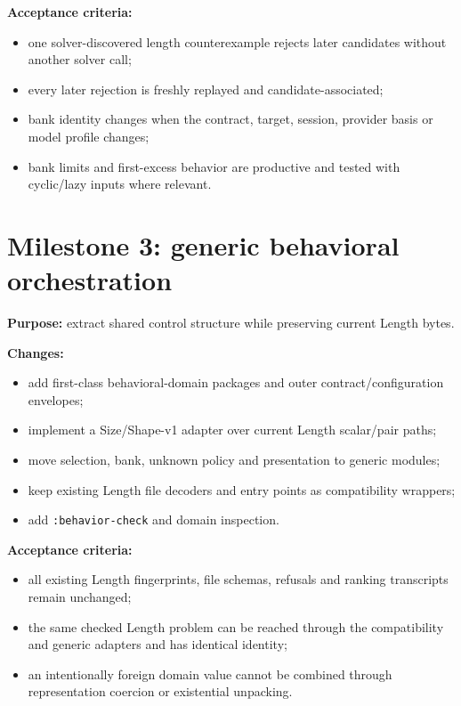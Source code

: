 \documentclass[11pt,oneside]{report}
\newcommand{\code}[1]{\texttt{#1}}
\begin{document}
\textbf{Acceptance criteria:}

\begin{itemize}[leftmargin=2em]
\item one solver-discovered length counterexample rejects later candidates without another solver call;
\item every later rejection is freshly replayed and candidate-associated;
\item bank identity changes when the contract, target, session, provider basis or model profile changes;
\item bank limits and first-excess behavior are productive and tested with cyclic/lazy inputs where relevant.
\end{itemize}

\section{Milestone 3: generic behavioral orchestration}

\textbf{Purpose:} extract shared control structure while preserving current Length bytes.

\textbf{Changes:}

\begin{itemize}[leftmargin=2em]
\item add first-class behavioral-domain packages and outer contract/configuration envelopes;
\item implement a Size/Shape-v1 adapter over current Length scalar/pair paths;
\item move selection, bank, unknown policy and presentation to generic modules;
\item keep existing Length file decoders and entry points as compatibility wrappers;
\item add \code{:behavior-check} and domain inspection.
\end{itemize}

\textbf{Acceptance criteria:}

\begin{itemize}[leftmargin=2em]
\item all existing Length fingerprints, file schemas, refusals and ranking transcripts remain unchanged;
\item the same checked Length problem can be reached through the compatibility and generic adapters and has identical identity;
\item an intentionally foreign domain value cannot be combined through representation coercion or existential unpacking.
\end{itemize}
\end{document}
